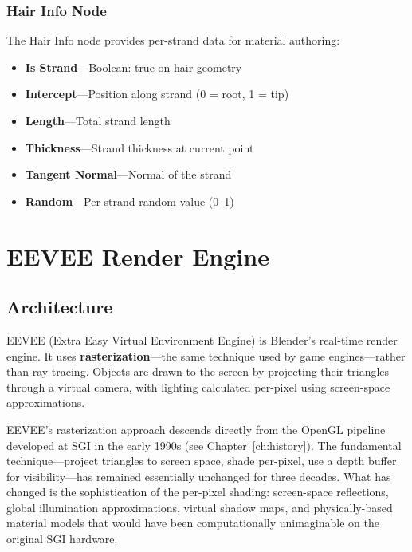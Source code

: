 \subsubsection{Hair Info Node}

The Hair Info node provides per-strand data for material authoring:

\begin{itemize}[leftmargin=2em]
  \item \textbf{Is Strand}---Boolean: true on hair geometry
  \item \textbf{Intercept}---Position along strand (0 = root, 1 = tip)
  \item \textbf{Length}---Total strand length
  \item \textbf{Thickness}---Strand thickness at current point
  \item \textbf{Tangent Normal}---Normal of the strand
  \item \textbf{Random}---Per-strand random value (0--1)
\end{itemize}


\section{EEVEE Render Engine}
\label{sec:shading:eevee}

\subsection{Architecture}

EEVEE (Extra Easy Virtual Environment Engine) is Blender's real-time
render engine. It uses \textbf{rasterization}---the same technique
used by game engines---rather than ray tracing. Objects are drawn to
the screen by projecting their triangles through a virtual camera,
with lighting calculated per-pixel using screen-space
approximations.

\begin{historynote}
EEVEE's rasterization approach descends directly from the OpenGL
pipeline developed at SGI in the early 1990s (see
Chapter~\ref{ch:history}). The fundamental technique---project
triangles to screen space, shade per-pixel, use a depth buffer for
visibility---has remained essentially unchanged for three decades.
What has changed is the sophistication of the per-pixel shading:
screen-space reflections, global illumination approximations,
virtual shadow maps, and physically-based material models that
would have been computationally unimaginable on the original SGI
hardware.
\end{historynote}

